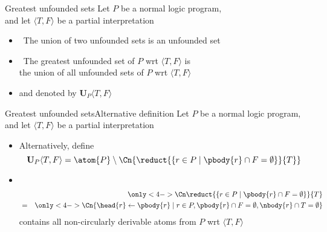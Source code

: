 \begin{frame}{Greatest unfounded sets}{\phantom{Alternative definition}}\label{unf:greatest}
  Let $P$ be a normal logic program,\\ and let
  $\langle T,F \rangle$ be a partial interpretation
  \medskip
  \begin{itemize}
  \item<2->  \ The union of two unfounded sets is an unfounded set
    \medskip
  \item<3->   \ The \alert{greatest unfounded set} of $P$ wrt $\langle T,F \rangle$ is
    \\ the union of all unfounded sets of $P$ wrt $\langle T,F \rangle$
  \item<4-> [] and denoted by $\mathbf{U}_P\langle T,F \rangle$
  \end{itemize}
\end{frame}
\begin{frame}{Greatest unfounded sets}{Alternative definition}
  Let $P$ be a normal logic program,\\ and let
  $\langle T,F \rangle$ be a partial interpretation
  \medskip
  \begin{itemize}
  \item<2-> Alternatively, define
    \[
      \mathbf{U}_P\langle T,F \rangle =
      \atom{P} \setminus
      \Cn{\reduct{\{r \in P \mid \pbody{r} \cap F = \emptyset\}}{T}}
    \]
  \item<3->  \
    \begin{eqnarray*}
      & & \only<4->{\Cn}{\reduct{\{r \in P \mid \pbody{r} \cap F = \emptyset\}}{T}}\\
      &=& \only<4->{\Cn}{\{\head{r}\leftarrow\pbody{r} \mid r\in P, \pbody{r} \cap F = \emptyset, \nbody{r}\cap T=\emptyset\}}
    \end{eqnarray*}
    \pause[4]
    contains all non-circularly derivable atoms from $P$ wrt $\langle T,F \rangle$
  \end{itemize}
\end{frame}
%
